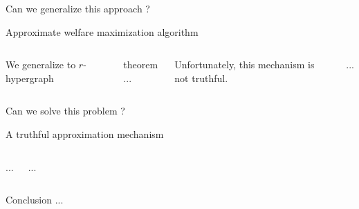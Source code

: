 \documentclass[aspectratio=169]{beamer}
\begin{document}
\begin{frame}[standout]
    Can we generalize this approach ?
\end{frame}

\begin{frame}{Approximate welfare maximization algorithm}
    \begin{columns}
        We generalize to $r$-hypergraph
        
        \begin{block}{theorem}
            ...
        \end{block}
        
        Unfortunately, this mechanism is not truthful.

        ...
    \end{columns}
\end{frame}

\begin{frame}[standout]
    Can we solve this problem ?
\end{frame}

\begin{frame}{A truthful approximation mechanism}
    \begin{columns}
        ...
        
        ...
    \end{columns}
\end{frame}

\begin{frame}{Conclusion}
    ...
\end{frame}

\end{document}

